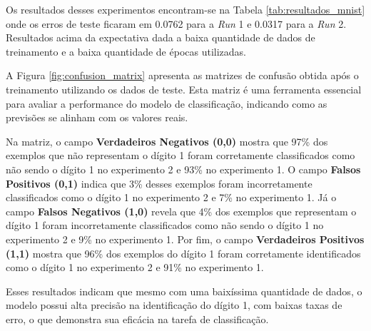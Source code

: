 
Os resultados desses experimentos encontram-se na Tabela \ref{tab:resultados_mnist} onde os erros de teste ficaram em 0.0762 para a \textit{Run} 1 e 0.0317 para a \textit{Run} 2. Resultados acima da expectativa dada a baixa quantidade de dados de treinamento e a baixa quantidade de épocas utilizadas.

A Figura \ref{fig:confusion_matrix}  apresenta as matrizes de confusão obtida após o treinamento utilizando os dados de teste. Esta matriz é uma ferramenta essencial para avaliar a performance do modelo de classificação, indicando como as previsões se alinham com os valores reais.

Na matriz, o campo \textbf{Verdadeiros Negativos (0,0)} mostra que 97\% dos exemplos que não representam o dígito 1 foram corretamente classificados como não sendo o dígito 1 no experimento 2 e 93\% no experimento 1. O campo \textbf{Falsos Positivos (0,1)} indica que 3\% desses exemplos foram incorretamente classificados como o dígito 1 no experimento 2 e 7\% no experimento 1. Já o campo \textbf{Falsos Negativos (1,0)} revela que 4\% dos exemplos que representam o dígito 1 foram incorretamente classificados como não sendo o dígito 1 no experimento 2 e 9\% no experimento 1. Por fim, o campo \textbf{Verdadeiros Positivos (1,1)} mostra que 96\% dos exemplos do dígito 1 foram corretamente identificados como o dígito 1 no experimento 2 e 91\% no experimento 1.

Esses resultados indicam que mesmo com uma baixíssima quantidade de dados, o modelo possui alta precisão na identificação do dígito 1, com baixas taxas de erro, o que demonstra sua eficácia na tarefa de classificação.

